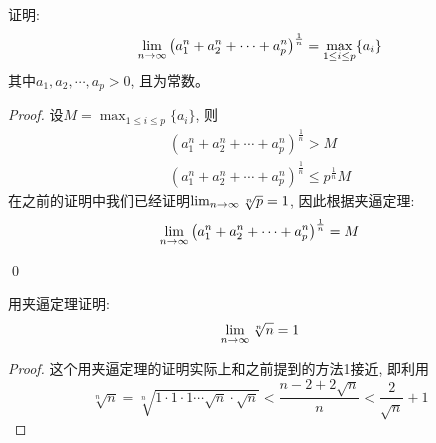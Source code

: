 \begin{example}
    证明:
    \begin{equation*}
        \lim_{n \to \infty } \left( a_1^n + a_2^n + \cdots + a_p^n \right)^\frac{1}{n} = \max_{1 \le i \le p}\{a_i\}
    \end{equation*}
    其中$a_1, a_2, \cdots, a_p > 0$, 且为常数。
\end{example}
\begin{proof}
    \def\tmp{\left(a_1^n + a_2^n + \cdots + a_p^n\right)^{\frac{1}{n}}}
    设$M = \max_{1 \le i \le p}\{a_i\}$, 则
    \begin{equation*}
        \begin{aligned}
            \tmp > M \\
            \tmp \le p^{\frac{1}{n}}M 
        \end{aligned}
    \end{equation*}
    在之前的证明中我们已经证明$\lim_{n \to \infty } \sqrt[n]{p} = 1$, 因此根据夹逼定理:
    \begin{equation*}
        \mylim{n}{\tmp} = M
    \end{equation*}

    \qed
\end{proof}

\begin{example}
    用夹逼定理证明:
    \begin{equation*}
        \lim_{n \to \infty } \sqrt[n]{n} = 1
    \end{equation*}
\end{example}
\begin{proof}
    这个用夹逼定理的证明实际上和之前提到的方法1接近, 即利用
    \begin{equation*}
        \sqrt[n]{n} = \sqrt[n]{1\cdot1\cdot1\cdots\sqrt{n}\cdot\sqrt{n}} <\frac{n-2+2\sqrt{n}}{n} < \frac{2}{\sqrt{n}} + 1
    \end{equation*}
\end{proof}

